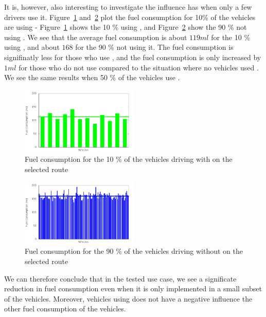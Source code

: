 It is, however, also interesting to investigate the influence \tech has when only a few drivers use it.
Figure~\ref{fig:TestResults:fuelControlled10} and~\ref{fig:TestResults:fuelUncontrolled10} plot the fuel consumption for 10\% of the vehicles are using \tech - Figure~\ref{fig:TestResults:fuelControlled10} shows the 10 \% using \tech, and Figure~\ref{fig:TestResults:fuelUncontrolled10} show the 90 \% not using \tech.
We see that the average fuel consumption is about $119 ml$ for the 10 \% using \tech, and about $168$ for the 90 \% not using it.
The fuel consumption is signifinatly less for those who use \tech, and the fuel consumption is only increased by $1 ml$ for those who do not use \tech compared to the situation where no vehicles used \tech.
We see the same results when 50 \% of the vehicles use \tech.
\begin{figure}[h]
\includegraphics[width=0.5\textwidth]{../images/tp0c1_0/fuelRouteControlled10.png}
\caption{Fuel consumption for the 10 \% of the vehicles driving with \tech on the selected route}
\label{fig:TestResults:fuelControlled10}
\end{figure}
\begin{figure}[h]
\includegraphics[width=0.5\textwidth]{../images/tp0c1_0/fuelRouteUncontrolled10.png}
\caption{Fuel consumption for the 90 \% of the vehicles driving without \tech on the selected route}
\label{fig:TestResults:fuelUncontrolled10}
\end{figure}

We can therefore conclude that in the tested use case, we see a significate reduction in fuel consumption even when it is only implemented in a small subset of the vehicles. 
Moreover, vehicles using \tech does not have a negative influence the other fuel consumption of the vehicles.

